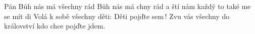 \begin{TEXT}{Pán Bůh nás má všechny rád}
\SLOKA {} Bůh nás má chny rád \NL
a ští nám každý  \NL
{}to také me se mít di 
\SLOKA Volá k sobě všechny děti: Děti pojďte sem\,! \NL
Zvu vás všechny do království \NL
kdo chce pojďte jdem. \NL
\end{TEXT}
